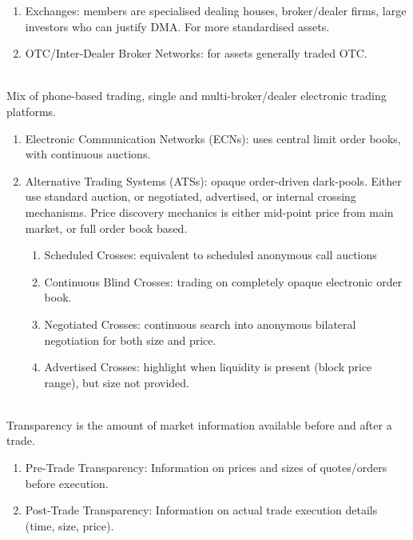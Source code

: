 
\begin{remark} 
\begin{enumerate}[label=\roman*.]
\setlength{\itemsep}{0pt}
\item Exchanges: members are specialised dealing houses, broker/dealer firms, large investors who can justify DMA. For more standardised assets.
\item OTC/Inter-Dealer Broker Networks: for assets generally traded OTC.
\end{enumerate}
\end{remark}

\begin{remark} \\
Mix of phone-based trading, single and multi-broker/dealer electronic trading platforms.
\end{remark}

\begin{remark} 
\begin{enumerate}[label=\roman*.]
\setlength{\itemsep}{0pt}
\item Electronic Communication Networks (ECNs): uses central limit order books, with continuous auctions.
\item Alternative Trading Systems (ATSs): opaque order-driven dark-pools. Either use standard auction, or negotiated, advertised, or internal crossing mechanisms. Price discovery mechanics is either mid-point price from main market, or full order book based.
\begin{enumerate}[label=\arabic*.]
\setlength{\itemsep}{0pt}
\item Scheduled Crosses: equivalent to scheduled anonymous call auctions
\item Continuous Blind Crosses: trading on completely opaque electronic order book.
\item Negotiated Crosses: continuous search into anonymous bilateral negotiation for both size and price.
\item Advertised Crosses: highlight when liquidity is present (block price range), but size not provided.
\end{enumerate}
\end{enumerate}
\end{remark}

\begin{remark} \\
Transparency is the amount of market information available before and after a trade.
\begin{enumerate}[label=\roman*.]
\setlength{\itemsep}{0pt}
\item Pre-Trade Transparency: Information on prices and sizes of quotes/orders before execution.
\item Post-Trade Transparency: Information on actual trade execution details (time, size, price).
\end{enumerate}
\end{remark}

